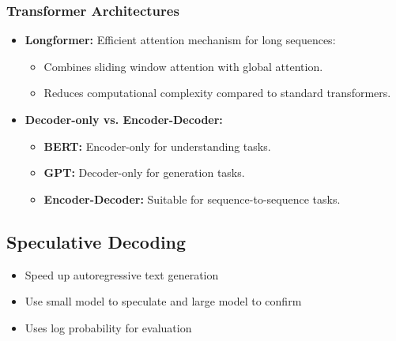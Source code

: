 \documentclass[12pt,a4paper]{article}
\begin{document}
\subsubsection{Transformer Architectures}
\begin{itemize}
    \item \textbf{Longformer:} Efficient attention mechanism for long sequences:
    \begin{itemize}
        \item Combines sliding window attention with global attention.
        \item Reduces computational complexity compared to standard transformers.
    \end{itemize}
    \item \textbf{Decoder-only vs. Encoder-Decoder:}
    \begin{itemize}
        \item \textbf{BERT:} Encoder-only for understanding tasks.
        \item \textbf{GPT:} Decoder-only for generation tasks.
        \item \textbf{Encoder-Decoder:} Suitable for sequence-to-sequence tasks.
    \end{itemize}
\end{itemize}
\subsection{Speculative Decoding} %
\begin{itemize}
    \item Speed up autoregressive  text generation 
    \item Use small model to speculate and large model to confirm 
    \item Uses log probability for evaluation 
\end{itemize}
\end{document}
